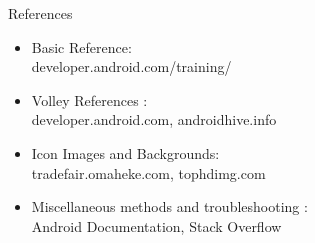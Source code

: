 \documentclass{beamer}
\begin{document}
\begin{frame}{References}
    
    \begin{itemize}
        \item {Basic Reference:\\developer.android.com/training/}
        \item {Volley References :\\ developer.android.com, androidhive.info}
        \item {Icon Images and Backgrounds:\\ tradefair.omaheke.com, tophdimg.com }
        \item {Miscellaneous methods and troubleshooting :\\ Android Documentation, Stack Overflow}
    \end{itemize}
    
\end{frame}
\end{document}
